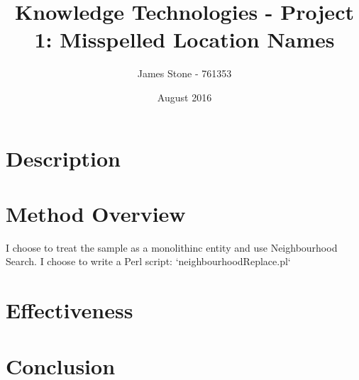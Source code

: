 \documentclass[a4paper]{article}
\title{Knowledge Technologies - Project 1: Misspelled Location Names}
\author{James Stone - 761353}
\date{August 2016}
\begin{document}
\maketitle

\section{Description}
\section{Method Overview}
I choose to treat the sample as a monolithinc entity and use Neighbourhood Search.
I choose to write a Perl script:  `neighbourhoodReplace.pl`
\section{Effectiveness}
\section{Conclusion}
\end{document}
